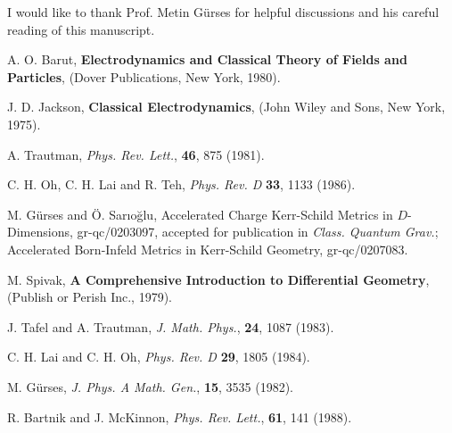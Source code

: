 \documentclass[a4paper,twocolumn,prd,showpacs,amsmath,amssymb]{revtex4}
\begin{document}
\begin{acknowledgments}

I would like to thank Prof. Metin G{\" u}rses for helpful discussions and his
careful reading of this manuscript.

\end{acknowledgments}

\begin{thebibliography}{99}

 A. O. Barut, {\bf Electrodynamics and Classical Theory of
Fields and Particles}, (Dover Publications, New York, 1980).

 J. D. Jackson, {\bf Classical Electrodynamics}, (John Wiley
and Sons, New York, 1975).

 A. Trautman, {\it Phys. Rev. Lett.}, {\bf 46}, 875 (1981).

 C. H. Oh, C. H. Lai and R. Teh, {\it Phys. Rev. D} {\bf 33}, 1133 (1986).

 M. G{\" u}rses and {\" O}. Sar{\i}o\u{g}lu, Accelerated Charge
Kerr-Schild Metrics in $D$-Dimensions, {\rm gr-qc/0203097}, accepted for
publication in {\it Class. Quantum Grav.}; Accelerated Born-Infeld Metrics
in Kerr-Schild Geometry, {\rm gr-qc/0207083}.

 M. Spivak, {\bf A Comprehensive Introduction to Differential
Geometry}, (Publish or Perish Inc., 1979).

 J. Tafel and A. Trautman, {\it J. Math. Phys.}, {\bf 24}, 1087 (1983).

 C. H. Lai and C. H. Oh, {\it Phys. Rev. D} {\bf 29}, 1805 (1984).

 M. G{\" u}rses, {\it J. Phys. A Math. Gen.}, {\bf 15}, 3535 (1982).

 R. Bartnik and J. McKinnon, {\it Phys. Rev. Lett.}, {\bf 61}, 141 (1988).

\end{thebibliography}
\end{document}
